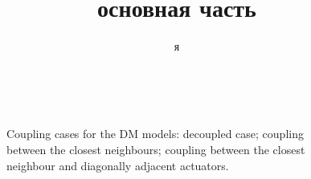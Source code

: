 \documentclass[a4paper, 12pt]{article}
\title{основная часть}
\author{я}
\begin{document}
\begin{figure}[ht!]  
\vspace{-4ex} \centering {}  
\hspace{4ex}
\hspace{4ex}
\caption{Coupling cases for the DM models:  decoupled case;  coupling between the closest neighbours;  coupling between the closest neighbour and diagonally adjacent actuators.} \label{fig:threeDMcases}
\end{figure}
\end{document}

